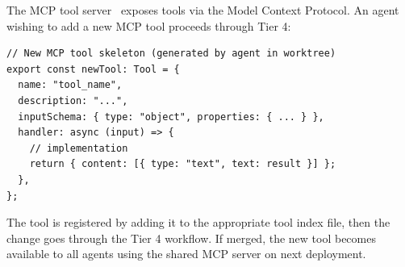 The MCP tool server~\cite{anthropic2024mcp} exposes tools via the Model Context
Protocol. An agent wishing to add a new MCP tool proceeds through Tier 4:

\begin{verbatim}
// New MCP tool skeleton (generated by agent in worktree)
export const newTool: Tool = {
  name: "tool_name",
  description: "...",
  inputSchema: { type: "object", properties: { ... } },
  handler: async (input) => {
    // implementation
    return { content: [{ type: "text", text: result }] };
  },
};
\end{verbatim}

The tool is registered by adding it to the appropriate tool index file, then
the change goes through the Tier 4 workflow. If merged, the new tool becomes
available to all agents using the shared MCP server on next deployment.


